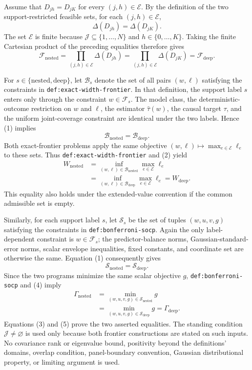 Assume that \(D_{jh}=D_{jK}\) for every \((j,h)\in\mathcal E\).  By the definition of the two support-restricted feasible sets, for each \((j,h)\in\mathcal E\),
\[
 \Delta(D_{jh})=\Delta(D_{jK}).
\]
The set \(\mathcal E\) is finite because \(\mathcal J\subseteq\{1,\ldots,N\}\) and \(h\in\{0,\ldots,K\}\).  Taking the finite Cartesian product of the preceding equalities therefore gives
\[
 \mathcal F_{\mathrm{nested}}
 =\prod_{(j,h)\in\mathcal E}\Delta(D_{jh})
 =\prod_{(j,h)\in\mathcal E}\Delta(D_{jK})
 =\mathcal F_{\mathrm{deep}}.
 \tag{1}
\]

For \(s\in\{\mathrm{nested},\mathrm{deep}\}\), let \(\mathcal B_s\) denote the set of all pairs \((w,\ell)\) satisfying the constraints in \texttt{def:exact-width-frontier}.  In that definition, the support label \(s\) enters only through the constraint \(w\in\mathcal F_s\).  The model class, the deterministic-outcome restriction on \(w\) and \(\ell\), the estimator \(\widehat\tau(w)\), the causal target \(\tau\), and the uniform joint-coverage constraint are identical under the two labels.  Hence (1) implies
\[
 \mathcal B_{\mathrm{nested}}=\mathcal B_{\mathrm{deep}}.
 \tag{2}
\]
Both exact-frontier problems apply the same objective \((w,\ell)\mapsto\max_{e\in\mathcal E}\ell_e\) to these sets.  Thus \texttt{def:exact-width-frontier} and (2) yield
\[
 \begin{aligned}
 W_{\mathrm{nested}}
 &=\inf_{(w,\ell)\in\mathcal B_{\mathrm{nested}}}
     \max_{e\in\mathcal E}\ell_e\\
 &=\inf_{(w,\ell)\in\mathcal B_{\mathrm{deep}}}
     \max_{e\in\mathcal E}\ell_e
 =W_{\mathrm{deep}}.
 \end{aligned}
 \tag{3}
\]
This equality also holds under the extended-value convention if the common admissible set is empty.

Similarly, for each support label \(s\), let \(\mathcal S_s\) be the set of tuples \((w,u,v,g)\) satisfying the constraints in \texttt{def:bonferroni-socp}.  Again the only label-dependent constraint is \(w\in\mathcal F_s\); the predictor-balance norms, Gaussian-standard-error norms, scalar envelope inequalities, fixed constants, and coordinate set are otherwise the same.  Equation (1) consequently gives
\[
 \mathcal S_{\mathrm{nested}}=\mathcal S_{\mathrm{deep}}.
 \tag{4}
\]
Since the two programs minimize the same scalar objective \(g\), \texttt{def:bonferroni-socp} and (4) imply
\[
 \begin{aligned}
 \Gamma_{\mathrm{nested}}
 &=\min_{(w,u,v,g)\in\mathcal S_{\mathrm{nested}}}g\\
 &=\min_{(w,u,v,g)\in\mathcal S_{\mathrm{deep}}}g
 =\Gamma_{\mathrm{deep}}.
 \end{aligned}
 \tag{5}
\]
Equations (3) and (5) prove the two asserted equalities.  The standing condition \(\mathcal J\ne\varnothing\) is used only because both frontier constructions are stated on such inputs.  No covariance rank or eigenvalue bound, positivity beyond the definitions' domains, overlap condition, panel-boundary convention, Gaussian distributional property, or limiting argument is used.
